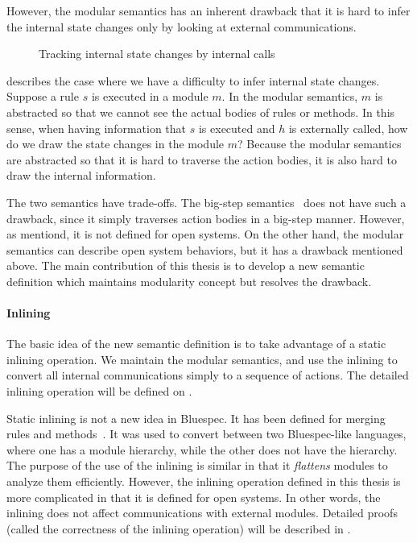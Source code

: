 However, the modular semantics has an inherent drawback that it is
hard to infer the internal state changes only by looking at external
communications.
\begin{figure}[t]
  \caption{Tracking internal state changes by internal calls}
  \label{ex-modular-semantics-disadvantage}
\end{figure}
 describes the case where we
have a difficulty to infer internal state changes. Suppose a rule $s$
is executed in a module $m$. In the modular semantics, $m$ is
abstracted so that we cannot see the actual bodies of rules or
methods. In this sense, when having information that $s$ is executed
and $h$ is externally called, how do we draw the state changes in the
module $m$? Because the modular semantics are abstracted so that it is
hard to traverse the action bodies, it is also hard to draw the
internal information.

The two semantics have trade-offs. The big-step
semantics~\cite{nirav-memocode} does not have such a drawback, since
it simply traverses action bodies in a big-step manner. However, as
mentiond, it is not defined for open systems. On the other hand, the
modular semantics can describe open system behaviors, but it has a
drawback mentioned above. The main contribution of this thesis is to
develop a new semantic definition which maintains modularity concept
but resolves the drawback.

\paragraph{Inlining}

The basic idea of the new semantic definition is to take advantage of
a static inlining operation. We maintain the modular semantics, and
use the inlining to convert all internal communications simply to a
sequence of actions. The detailed inlining operation will be defined
on .

Static inlining is not a new idea in Bluespec. It has been defined for
merging rules and methods~\cite{daniel-thesis}. It was used to convert
between two Bluespec-like languages, where one has a module hierarchy,
while the other does not have the hierarchy. The purpose of the use of
the inlining is similar in that it \emph{flattens} modules to analyze
them efficiently. However, the inlining operation defined in this
thesis is more complicated in that it is defined for open systems. In
other words, the inlining does not affect communications with external
modules. Detailed proofs (called the correctness of the inlining
operation) will be described in .


